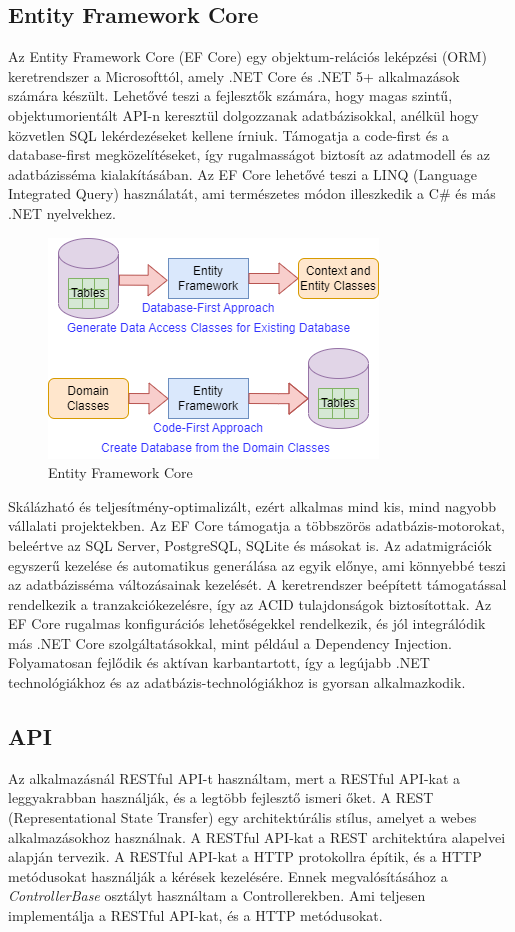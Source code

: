 \subsection*{Entity Framework Core}
Az Entity Framework Core (EF Core) egy objektum-relációs leképzési (ORM) keretrendszer a Microsofttól,
amely .NET Core és .NET 5+ alkalmazások számára készült.
Lehetővé teszi a fejlesztők számára, hogy magas szintű,
objektumorientált API-n keresztül dolgozzanak adatbázisokkal,
anélkül hogy közvetlen SQL lekérdezéseket kellene írniuk.
Támogatja a code-first és a database-first megközelítéseket,
így rugalmasságot biztosít az adatmodell és az adatbázisséma kialakításában. Az EF Core lehetővé teszi a LINQ (Language Integrated Query) használatát,
ami természetes módon illeszkedik a C\# és más .NET nyelvekhez.

\begin{figure}[H]
    \centering
    \includegraphics[width=10.0truecm]{images/EntityFramework.png}
    \caption{Entity Framework Core}
    \label{fig:entity_framework_core}
\end{figure}

Skálázható és teljesítmény-optimalizált, ezért alkalmas mind kis,
mind nagyobb vállalati projektekben. Az EF Core támogatja a többszörös adatbázis-motorokat, beleértve az SQL Server, PostgreSQL, SQLite és másokat is.
Az adatmigrációk egyszerű kezelése és automatikus generálása az egyik előnye, ami könnyebbé teszi az adatbázisséma változásainak kezelését.
A keretrendszer beépített támogatással rendelkezik a tranzakciókezelésre, így az ACID tulajdonságok biztosítottak. Az EF Core rugalmas konfigurációs lehetőségekkel rendelkezik,
és jól integrálódik más .NET Core szolgáltatásokkal, mint például a Dependency Injection. Folyamatosan fejlődik és aktívan karbantartott,
így a legújabb .NET technológiákhoz és az adatbázis-technológiákhoz is gyorsan alkalmazkodik.

\subsection*{API}
Az alkalmazásnál RESTful API-t használtam, mert a RESTful API-kat a leggyakrabban használják,
és a legtöbb fejlesztő ismeri őket. A REST (Representational State Transfer) egy architektúrális stílus,
amelyet a webes alkalmazásokhoz használnak. A RESTful API-kat a REST architektúra alapelvei alapján tervezik.
A RESTful API-kat a HTTP protokollra építik, és a HTTP metódusokat használják a kérések kezelésére.
Ennek megvalósításához a \textit{ControllerBase} osztályt használtam a Controllerekben.
Ami teljesen implementálja a RESTful API-kat, és a HTTP metódusokat.

